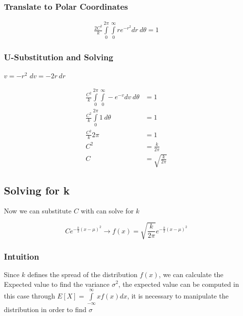 \documentclass{article}
\begin{document}
\subsubsection{Translate to Polar Coordinates}

\begin{align}
  \frac{2C^2}{k}\int\limits_{0}^{2\pi}\int\limits_{0}^{\infty}re^{-r^2} dr\ d\theta = 1
\end{align}

\subsubsection{U-Substitution and Solving}

\begin{multicols}{2}
  $v = -r^2$
  \vfill\columnbreak
  $dv = -2r\ dr$
\end{multicols}

\begin{align}
  \frac{C^2}{k}\int\limits_{0}^{2\pi}\int\limits_{0}^{\infty}-e^{-v}dv\ d\theta &= 1\\
  \frac{C^2}{k}\int\limits_{0}^{2\pi}1\ d\theta &= 1\\
  \frac{C^2}{k}2\pi &= 1\\
  C^2 &= \frac{k}{2\pi}\\
  C &= \sqrt{\frac{k}{2\pi}}
\end{align}

\subsection{Solving for k}

Now we can substitute $C$ with can solve for $k$

\begin{equation}
  \label{eq:Distribution}
  Ce^{-\frac{k}{2}\left( x - \mu \right)^2} \longrightarrow f(x)=\sqrt{\frac{k}{2\pi}}e^{-\frac{k}{2}\left( x - \mu \right)^2}
\end{equation}

\subsubsection{Intuition}

Since $k$ defines the spread of the distribution $f(x)$, we can calculate the
Expected value to find the variance $\sigma^2$, the expected value can be
computed in this case through $E[X]=\int\limits_{-\infty}^{\infty}xf(x)dx$, it
is necessary to manipulate the distribution in order to find $\sigma$
\end{document}
